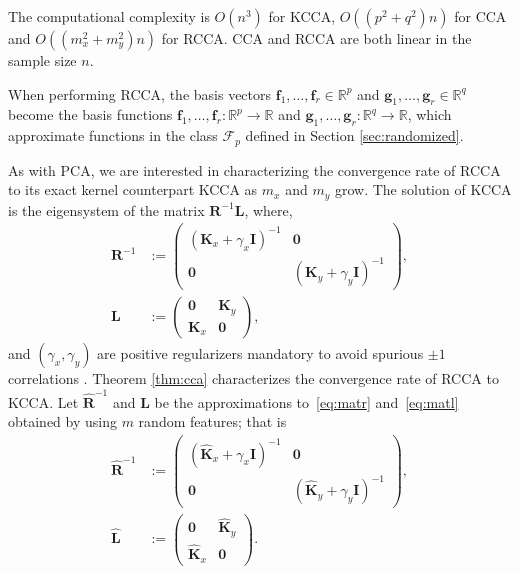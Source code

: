 \documentclass{article}
\begin{document}
  The computational complexity is $O(n^3)$ for KCCA, $O((p^2+q^2)n)$ for CCA
  and $O((m_x^2+m_y^2)n)$ for RCCA. CCA and RCCA are both linear in the sample
  size $n$.

  When performing RCCA, the basis vectors $\bm f_1,\ldots, \bm f_r \in
  \mathbb{R}^p$ and $\bm g_1, \ldots, \bm g_r \in \mathbb{R}^q$ become the
  basis functions $\bm f_1, \ldots, \bm f_r : \mathbb{R}^p \rightarrow
  \mathbb{R}$ and $\bm g_1, \ldots, \bm g_r : \mathbb{R}^q \rightarrow
  \mathbb{R}$, which approximate functions in the class $\mathcal{F}_p$ defined
  in Section \ref{sec:randomized}.
  
  As with PCA, we are interested in characterizing the convergence rate of RCCA
  to its exact kernel counterpart KCCA as $m_x$ and $m_y$ grow. The solution of
  KCCA is the eigensystem of the matrix $\bm R^{-1} \bm L$, where, 
  \begin{align}
    \bm {R}^{-1} & := \begin{pmatrix} (\bm K_x+\gamma_x \bm I)^{-1} & \bm 0\\
    \bm 0 & (\bm K_y +\gamma_y \bm I)^{-1}\end{pmatrix},\label{eq:matr}\\ \bm L
    & := \begin{pmatrix} \bm 0 & \bm K_y\\ \bm K_x & \bm
    0\end{pmatrix},\label{eq:matl}
  \end{align}
  and $(\gamma_x,\gamma_y)$ are positive regularizers mandatory to avoid
  spurious $\pm 1$ correlations \citep{Bach02}.  Theorem \ref{thm:cca}
  characterizes the convergence rate of RCCA to KCCA. Let $\hat{\bm R}^{-1}$
  and $\hat{\bm L}$ be the approximations to~\eqref{eq:matr}
  and~\eqref{eq:matl} obtained by using $m$ random features; that is
  \begin{align}
    \hat{\bm R}^{-1} & := \begin{pmatrix} (\hat{\bm K}_x+\gamma_x \bm I)^{-1} &
    \bm 0\\ \bm 0 & (\hat{\bm K}_y +\gamma_y \bm I)^{-1}
    \end{pmatrix},\label{eq:matrh}\\ \hat{\bm L} & := \begin{pmatrix} \bm 0 &
    \hat{\bm K}_y \\ \hat{\bm K}_x & \bm 0 \end{pmatrix}\label{eq:matlh}.
  \end{align}
\end{document}
